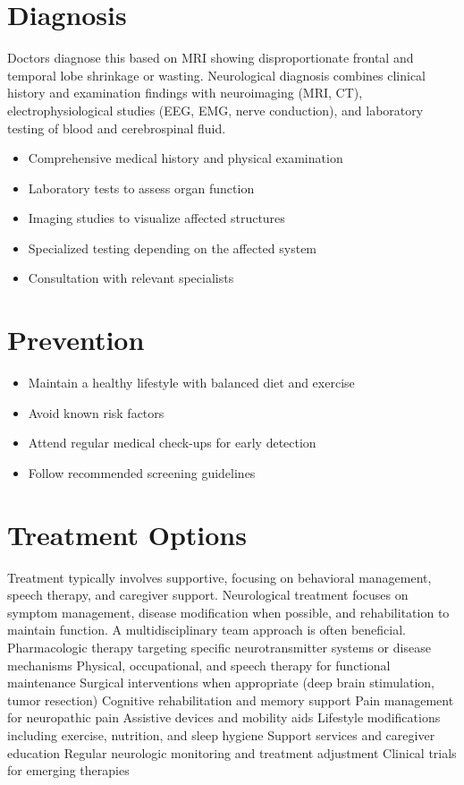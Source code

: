 \section{Diagnosis}
Doctors diagnose this based on MRI showing disproportionate frontal and temporal lobe shrinkage or wasting. Neurological diagnosis combines clinical history and examination findings with neuroimaging (MRI, CT), electrophysiological studies (EEG, EMG, nerve conduction), and laboratory testing of blood and cerebrospinal fluid.

\begin{itemize}[noitemsep]
  \item Comprehensive medical history and physical examination
  \item Laboratory tests to assess organ function
  \item Imaging studies to visualize affected structures
  \item Specialized testing depending on the affected system
  \item Consultation with relevant specialists
\end{itemize}
\section{Prevention}
\begin{itemize}[noitemsep]
  \item Maintain a healthy lifestyle with balanced diet and exercise
  \item Avoid known risk factors
  \item Attend regular medical check-ups for early detection
  \item Follow recommended screening guidelines
\end{itemize}
\section{Treatment Options}
Treatment typically involves supportive, focusing on behavioral management, speech therapy, and caregiver support. Neurological treatment focuses on symptom management, disease modification when possible, and rehabilitation to maintain function. A multidisciplinary team approach is often beneficial. Pharmacologic therapy targeting specific neurotransmitter systems or disease mechanisms Physical, occupational, and speech therapy for functional maintenance Surgical interventions when appropriate (deep brain stimulation, tumor resection) Cognitive rehabilitation and memory support Pain management for neuropathic pain Assistive devices and mobility aids Lifestyle modifications including exercise, nutrition, and sleep hygiene Support services and caregiver education Regular neurologic monitoring and treatment adjustment Clinical trials for emerging therapies

